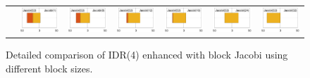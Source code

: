 \begin{landscape}
\begin{figure}
\begin{center}
{\begin{tabular}{c|cccccc}
\\
&
\includegraphics[width=.135\columnwidth]{plots/Jacobi(32)_vs_Jacobi(1).pdf}
&
\includegraphics[width=.135\columnwidth]{plots/Jacobi(32)_vs_Jacobi(8).pdf}
&
\includegraphics[width=.135\columnwidth]{plots/Jacobi(32)_vs_Jacobi(12).pdf}
&
\includegraphics[width=.135\columnwidth]{plots/Jacobi(32)_vs_Jacobi(16).pdf}
&
\includegraphics[width=.135\columnwidth]{plots/Jacobi(32)_vs_Jacobi(24).pdf}
&
 \includegraphics[width=.135\columnwidth]{plots/Jacobi(32)_vs_Jacobi(32).pdf}
\\
\end{tabular}
}
\end{center}
\caption{
Detailed comparison of IDR(4) enhanced with block Jacobi
using different block sizes.
}
\label{fig:solverperformance-detailed}
\end{figure}

\end{landscape}
